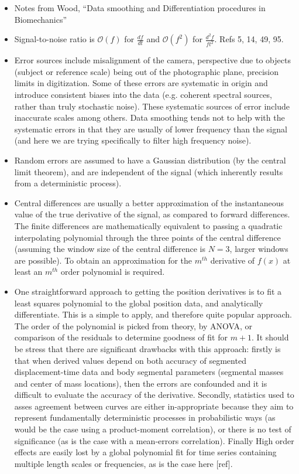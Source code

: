 \documentclass[a4paper, 12pt]{article}
\begin{document}
\begin{itemize}
\item Notes from Wood, ``Data smoothing and Differentiation procedures in Biomechanics''

\item Signal-to-noise ratio is $\mathcal{O}(f)$ for $\frac{df}{dt}$ and $\mathcal{O}(f^2)$ for $\frac{d^2f}{ft^2}$. Refs 5, 14, 49, 95.

\item Error sources include misalignment of the camera, perspective due to objects (subject or reference scale) being out of the photographic plane, precision limits in digitization. Some of these errors are systematic in origin and introduce consistent biases into the data (e.g. coherent spectral sources, rather than truly stochastic noise). These systematic sources of error include inaccurate scales among others. Data smoothing tends not to help with the systematic errors in that they are usually of lower frequency than the signal (and here we are trying specifically to filter high frequency noise).

\item Random errors are assumed to have a Gaussian distribution (by the central limit theorem), and are independent of the signal (which inherently results from a deterministic process).

\item Central differences are usually a better approximation of the instantaneous value of the true derivative of the signal, as compared to forward differences. The finite differences are mathematically equivalent to passing a quadratic interpolating polynomial through the three points of the central difference (assuming the window size of the central difference is $N=3$, larger windows are possible). To obtain an approximation for the $m^{th}$ derivative of $f(x)$ at least an $m^{th}$ order polynomial is required.

\item One straightforward approach to getting the position derivatives is to fit a least squares polynomial to the global position data, and analytically differentiate. This is a simple to apply, and therefore quite popular approach. The order of the polynomial is picked from theory, by ANOVA, or comparison of the residuals to determine goodness of fit for $m+1$. It should be stress that there are significant drawbacks with this approach: firstly is that when derived values depend on both accuracy of segmented displacement-time data and body segmental parameters (segmental masses and center of mass locations), then the errors are confounded and it is difficult to evaluate the accuracy of the derivative. Secondly, statistics used to asses agreement between curves are either in-appropriate because they aim to represent fundamentally deterministic processes in probabilistic ways (as would be the case using a product-moment correlation), or there is no test of significance (as is the case with a mean-errors correlation). Finally High order effects are easily lost by a global polynomial fit for time series containing multiple length scales or frequencies, as is the case here [ref].
\end{itemize}
\end{document}
